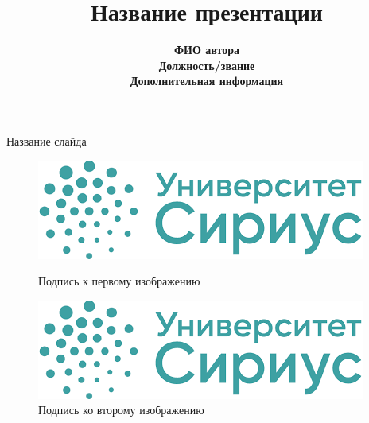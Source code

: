 \documentclass[10pt]{beamer}  %
\title[Краткий заголовок]{\bf 
Название презентации}  %
\date[]{}  %
\author[Автор] {\bf 
ФИО автора \\ 
Должность/звание \\ 
Дополнительная информация}
\institute[] {
НТУ <<Сириус>> \\ 
Название направления \\ 
Название лаборатории
}
\begin{document}
\maketitle

\begin{frame}{Название слайда}

\begin{figure}
    \begin{minipage}{0.45\textwidth}
        \centering
        \includegraphics[width=\linewidth]{images/Sirius-logo.png}
        \caption{Подпись к первому изображению}
    \end{minipage}
    \hfill
    \begin{minipage}{0.45\textwidth}
        \centering
        \includegraphics[width=\linewidth]{images/Sirius-logo.png}
        \caption{Подпись ко второму изображению}
    \end{minipage}
\end{figure}

\end{frame}
\end{document}
